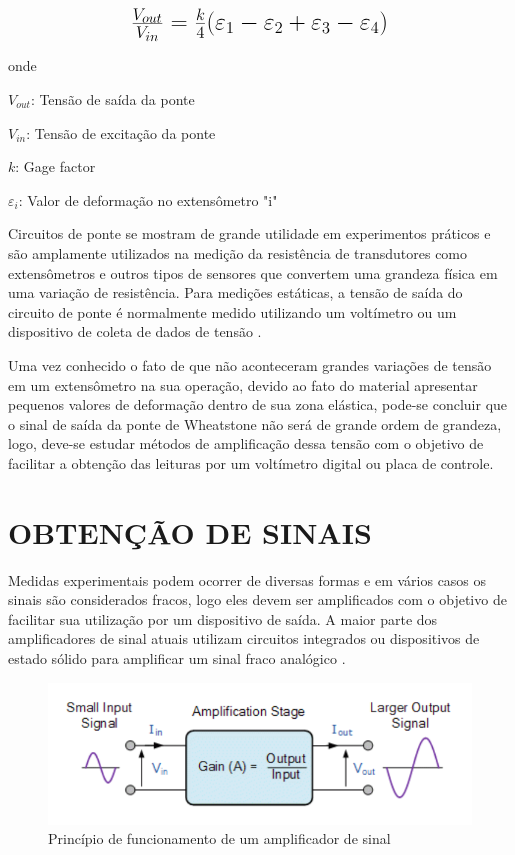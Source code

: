 \begin{equation}\label{eq:Eq_225}%
\mbox{\fontsize{17.28}{21.6}\selectfont\( %
\frac{V_{out}}{V_{in}} = \frac{k}{4}(\varepsilon_1 - \varepsilon_2 + \varepsilon_3 - \varepsilon_4)
\)} %
\end{equation}

onde

$V_{out}$: Tensão de saída da ponte

$V_{in}$: Tensão de excitação da ponte

$k$: Gage factor

$\varepsilon_{i}$: Valor de deformação no extensômetro "i"

\hfill

Circuitos de ponte se mostram de grande utilidade em experimentos práticos e são amplamente utilizados na medição da resistência de transdutores como extensômetros
e outros tipos de sensores que convertem uma grandeza física em uma variação de resistência. Para medições estáticas, a tensão de saída do circuito de ponte é normalmente
medido utilizando um voltímetro ou um dispositivo de coleta de dados de tensão \autocite{Hollman2011}.

Uma vez conhecido o fato de que não aconteceram grandes variações de tensão em um extensômetro na sua operação, devido ao fato do material apresentar pequenos valores de
deformação dentro de sua zona elástica, pode-se concluir que o sinal de saída da ponte de Wheatstone não será de grande ordem de grandeza, logo, deve-se estudar métodos de
amplificação dessa tensão com o objetivo de facilitar a obtenção das leituras por um voltímetro digital ou placa de controle.

\section{OBTENÇÃO DE SINAIS}

Medidas experimentais podem ocorrer de diversas formas e em vários casos os sinais são considerados fracos, logo eles devem ser amplificados com o objetivo de facilitar sua
utilização por um dispositivo de saída. A maior parte dos amplificadores de sinal atuais utilizam circuitos integrados ou dispositivos de estado sólido para amplificar um
sinal fraco analógico \autocite{Hollman2011}.

\begin{figure}[htb]
	\caption{\label{fig:1100} Princípio de funcionamento de um amplificador de sinal}
	\begin{center}
		\includegraphics[width=\textwidth]{pictures/1100.png}
	\end{center}
\end{figure}

